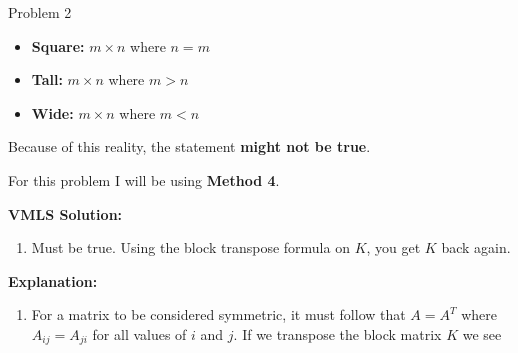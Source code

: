 \begin{problem}{Problem 2}
\begin{highlight}
\begin{enumerate}[label = (\alph*), start = 2]
            \begin{itemize}
                \item \textbf{Square:} $m \times n$ where $n = m$
                \item \textbf{Tall:} $m \times n$ where $m > n$
                \item \textbf{Wide:} $m \times n$ where $m < n$
            \end{itemize}
            Because of this reality, the statement \textbf{might not be true}.
        \end{enumerate}
    \end{highlight}

    \begin{highlight}
        For this problem I will be using \textbf{Method 4}. \vspace*{1em}

        \noindent \textbf{VMLS Solution:}

        \begin{enumerate}[label = (\alph*), start = 3]
            \item Must be true. Using the block transpose formula on $K$, you get $K$ back again.
        \end{enumerate}

        \noindent \textbf{Explanation:}

        \begin{enumerate}[label = (\alph*), start = 3]
            \item For a matrix to be considered symmetric, it must follow that $A = A^{T}$ where $A_{ij} = A_{ji}$ for all values of $i$ and $j$. If we transpose the block matrix $K$ we see
            

\end{enumerate}
\end{highlight}
\end{problem}

